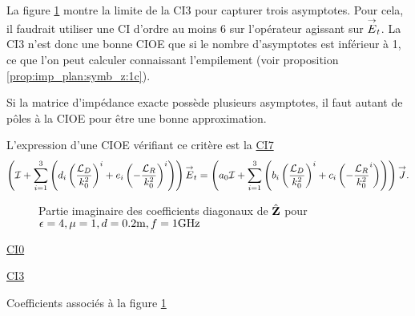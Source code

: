       \FloatBarrier

      La figure \ref{fig:imp_fourier:plan:triple_asymptote:hoibc} montre la limite de la CI3 pour capturer trois asymptotes. Pour cela, il faudrait utiliser une CI d'ordre au moins 6 sur l'opérateur agissant sur \({\overset{\rightarrow}{E}}_t\). La CI3 n'est donc une bonne CIOE que si le nombre d'asymptotes est inférieur à 1, ce que l'on peut calculer connaissant l'empilement (voir proposition \ref{prop:imp_plan:symb_z:1c}).

      Si la matrice d'impédance exacte possède plusieurs asymptotes, il faut autant de pôles à la CIOE pour être une bonne approximation.

      L'expression d'une CIOE vérifiant ce critère est la \hyperlink{ci7}{CI7}
      \begin{equation}
        \left({\mathcal{I}} + \sum_{i=1}^3 \left(d_{i} \left(\dfrac{{\mathcal{L}_D}}{k_0^2}\right)^i + e_{i} \left(-\dfrac{{\mathcal{L}_R}}{k_0^2}\right)^i \right)\right){\overset{\rightarrow}{E}}_t = \left(a_0 {\mathcal{I}} + \sum_{i=1}^3 \left(b_{i} \left(\dfrac{{\mathcal{L}_D}}{k_0^2}\right)^i + c_{i} \left(-\dfrac{{\mathcal{L}_R}}{k_0^2}^i\right) \right)\right){\overset{\rightarrow}{J}}.
      \end{equation}

      \begin{figure}[!hbt]
          \centering
          
          \caption[Partie imaginaire de l'opérateur de Calderón, comparé avec les approximations CI0, CI3 pour une couche plane de matériau sans pertes, avec triple asymptote]{Partie imaginaire des coefficients diagonaux de \(\hat{\mathbf{Z}}\) pour \(\epsilon = 4, \mu = 1, d=0.2\text{m}, f=1\text{GHz}\)}
          \label{fig:imp_fourier:plan:triple_asymptote:hoibc}
      \end{figure}
      \begin{table}[!hbt]
        \centering
        \begin{minipage}[t]{0.49\textwidth}
        \vspace{0pt}
        \centering
        \begin{coefftable}{\hyperlink{ci0}{CI0}}
          
        \end{coefftable}

        \begin{coefftable}{\hyperlink{ci3}{CI3}}
          
        \end{coefftable}
        \end{minipage}
        \caption{Coefficients associés à la figure \ref{fig:imp_fourier:plan:triple_asymptote:hoibc}}
        \label{tab:imp_fourier:plan:triple_asymptote:hoibc}
      \end{table}
